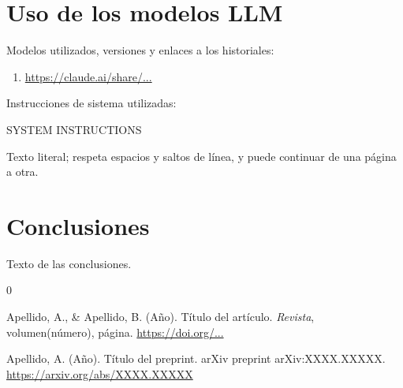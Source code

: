 \documentclass[letterpaper, 12pt]{article}
\begin{document}
    \section{Uso de los modelos LLM}
        Modelos utilizados, versiones y enlaces a los historiales:

        \begin{enumerate}
            \item \url{https://claude.ai/share/...}
        \end{enumerate}

        Instrucciones de sistema utilizadas:

        \begin{PromptBlock}
SYSTEM INSTRUCTIONS

Texto literal; respeta espacios y saltos de línea, y puede continuar
de una página a otra.
        \end{PromptBlock}

    \section{Conclusiones}
        Texto de las conclusiones.

    \begin{thebibliography}{0}

         Apellido, A., \& Apellido, B. (Año). Título del artículo. \textit{Revista}, volumen(número), página. \url{https://doi.org/...}

         Apellido, A. (Año). Título del preprint. arXiv preprint arXiv:XXXX.XXXXX. \url{https://arxiv.org/abs/XXXX.XXXXX}

    \end{thebibliography}
\end{document}
